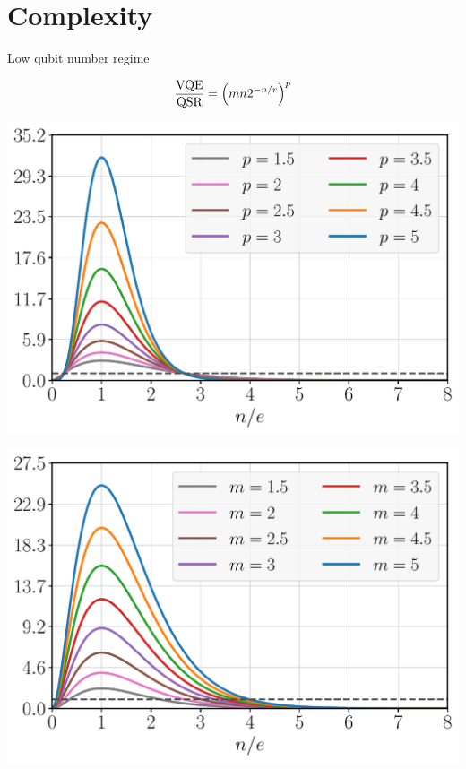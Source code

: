\documentclass[9pt, handout, aspectratio=169]{beamer}	%
\begin{document}

\section{Complexity}

\begin{frame}{Low qubit number regime}

	\vspace{1em}
	\begin{gather*}
		\frac{\textnormal{VQE}}{\textnormal{QSR}} = \qty(m n 2^{-n/r})^{p}
	\end{gather*}

	\vspace{-1em}
	\begin{multicols}{2}

		\begin{center}
			\includegraphics[width=.40\paperwidth]{Figures/VQE-vs-QSR_p}
		\end{center}

		\columnbreak

		\begin{center}
			\includegraphics[width=.40\paperwidth]{Figures/VQE-vs-QSR_m}
		\end{center}

	\end{multicols}

\end{frame}
\end{document}
